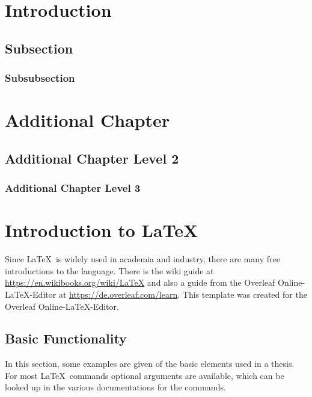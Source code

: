 \documentclass[11pt,a4paper]{article} %
\let\stdsection\section
\renewcommand\section{\clearpage\newpage\stdsection}
\begin{document}








\section{Introduction}
\subsection{Subsection}
\subsubsection{Subsubsection}

\section{Additional Chapter}
\subsection{Additional Chapter Level 2}
\subsubsection{Additional Chapter Level 3}

\section{Introduction to \LaTeX}
Since \LaTeX\ is widely used in academia and industry, there are many free introductions to the language. There is the wiki guide at \url{https://en.wikibooks.org/wiki/LaTeX} and also a guide from the Overleaf Online-LaTeX-Editor at \url{https://de.overleaf.com/learn}. This template was created for the Overleaf Online-LaTeX-Editor.

\subsection{Basic Functionality}
In this section, some examples are given of the basic elements used in a thesis.
For most \LaTeX\ commands optional arguments are available, which can be looked up in the various documentations for the commands.
\end{document}
